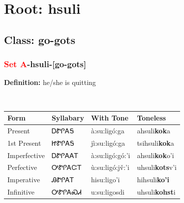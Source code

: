 \needspace{4in}
\section*{Root: hsuli}
\nopagebreak
{}
\needspace{3in}
\subsection*{Class: go-gots}
\nopagebreak
\needspace{2in}
\subsubsection*{\textcolor{Red}{Set A}{-}\textbf{hsuli}{-}[go-gots]}
\nopagebreak
\textbf{Definition: } he/she is quitting
\\[0.5em]
\begin{tabularx}{\textwidth}{l X X X}%
\toprule%
\textbf{Form}&\textbf{Syllabary}&\textbf{With Tone}&\textbf{Toneless}\\%
\midrule%
Present&ᎠᏑᎵᎪᎦ&à:su:ligó:ga&ahsuli\textbf{kok}a\\%
1st Present&ᏥᏑᎵᎪᎦ&jì:su:ligó:ga&tsihsuli\textbf{kok}a\\%
Imperfective&ᎠᏑᎵᎪᎪᎢ&à:su:ligó:gó:’i&ahsuli\textbf{kok}o'i\\%
Perfective&ᎤᏑᎵᎪᏨᎢ&ù:su:ligó:jv̌:’i&uhsuli\textbf{kots}v'i\\%
Imperative&ᎯᏑᎵᎪᎢ&hisu:ligo’i&hihsuli\textbf{ko'i}\\%
Infinitive&ᎤᏑᎵᎪᏍᏗ&u:su:ligosdi&uhsuli\textbf{kohst}i\\%
\bottomrule%
\end{tabularx}
\\[1em]
